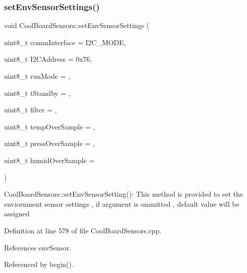 \subsubsection{\texorpdfstring{set\+Env\+Sensor\+Settings()}{setEnvSensorSettings()}}
{\footnotesize\ttfamily void Cool\+Board\+Sensors\+::set\+Env\+Sensor\+Settings (\begin{DoxyParamCaption}\item[{uint8\+\_\+t}]{comm\+Interface = {\ttfamily I2C\+\_\+MODE},  }\item[{uint8\+\_\+t}]{I2\+C\+Address = {\ttfamily 0x76},  }\item[{uint8\+\_\+t}]{run\+Mode = {},  }\item[{uint8\+\_\+t}]{t\+Standby = {},  }\item[{uint8\+\_\+t}]{filter = {},  }\item[{uint8\+\_\+t}]{temp\+Over\+Sample = {},  }\item[{uint8\+\_\+t}]{press\+Over\+Sample = {},  }\item[{uint8\+\_\+t}]{humid\+Over\+Sample = {} }\end{DoxyParamCaption})}

Cool\+Board\+Sensors\+::set\+Env\+Sensor\+Setting()\+: This method is provided to set the enviornment sensor settings , if argument is ommitted , default value will be assigned 

Definition at line 578 of file Cool\+Board\+Sensors.\+cpp.



References env\+Sensor.



Referenced by begin().


